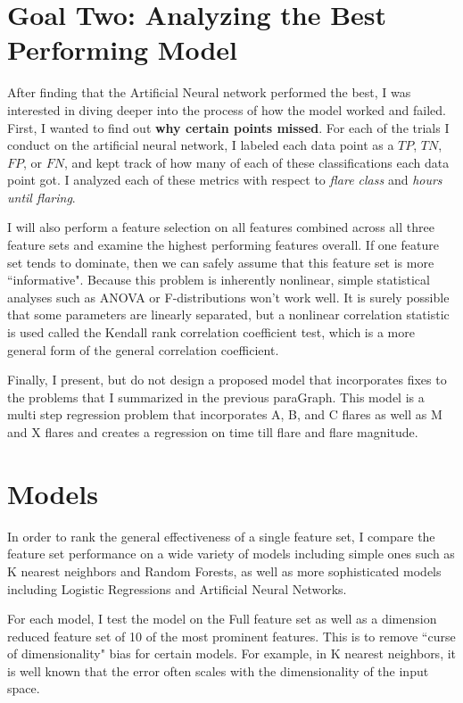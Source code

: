 \section{Goal Two: Analyzing the Best Performing Model}

After finding that the Artificial Neural network performed the best, I was interested in diving deeper into the process of how the model worked and failed. First, I wanted to find out \textbf{why certain points missed}. For each of the trials I conduct on the artificial neural network, I labeled each data point as a $TP$, $TN$, $FP$, or $FN$, and kept track of how many of each of these classifications each data point got. I analyzed each of these metrics with respect to \textit{flare class} and \textit{hours until flaring}.

I will also perform a feature selection on all features combined across all three feature sets and examine the highest performing features overall. If one feature set tends to dominate, then we can safely assume that this feature set is more ``informative". Because this problem is inherently nonlinear, simple statistical analyses such as ANOVA or F-distributions won't work well. It is surely possible that some parameters are linearly separated, but a nonlinear correlation statistic is used called the Kendall rank correlation coefficient test, which is a more general form of the general correlation coefficient. 

Finally, I present, but do not design a proposed model that incorporates fixes to the problems that I summarized in the previous paraGraph. This model is a multi step regression problem that incorporates A, B, and C flares as well as M and X flares and creates a regression on time till flare and flare magnitude.

\section{Models}

In order to rank the general effectiveness of a single feature set, I compare the feature set performance on a wide variety of models including simple ones such as K nearest neighbors and Random Forests, as well as more sophisticated models including Logistic Regressions and Artificial Neural Networks.

For each model, I test the model on the Full feature set as well as a dimension reduced feature set of 10 of the most prominent features. This is to remove ``curse of dimensionality" bias for certain models. For example, in K nearest neighbors, it is well known that the error often scales with the dimensionality of the input space. 

